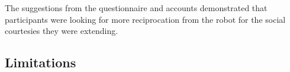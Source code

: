 \documentclass[letterpaper, 10 pt, conference]{ieeeconf}  %
\begin{document}
The suggestions from the questionnaire and accounts demonstrated that participants were looking for more reciprocation from the robot for the social courtesies they were extending.













\subsection{Limitations}
\end{document}
